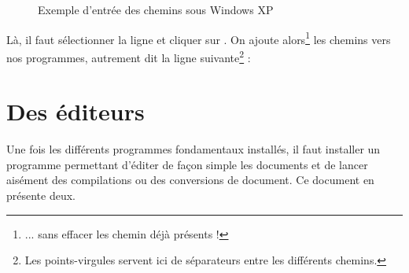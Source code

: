\begin{figure}[H]
\centering
{}
\caption{Exemple d'entrée des chemins sous Windows XP}
\end{figure}

Là, il faut sélectionner la ligne  et cliquer sur . On ajoute alors\footnote{... sans effacer les chemin déjà présents !} les chemins vers nos programmes, autrement dit la ligne suivante\footnote{Les points-virgules servent ici de séparateurs entre les différents chemins.} :
\begin{center}
\end{center}


\section{Des éditeurs} \label{éditeurs}

Une fois les différents programmes fondamentaux installés, il faut installer un programme permettant d'éditer de façon simple les documents  et de lancer aisément des compilations ou des conversions de document. Ce document en présente deux. 

